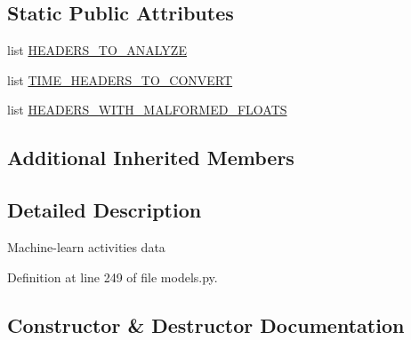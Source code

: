 \subsection*{Static Public Attributes}
\begin{DoxyCompactItemize}
\item 
list \hyperlink{classpygce_1_1analysis_1_1models_1_1_activities_data_analysis_a799ad90125cc686b985fe525a3b33062}{H\+E\+A\+D\+E\+R\+S\+\_\+\+T\+O\+\_\+\+A\+N\+A\+L\+Y\+ZE}
\item 
list \hyperlink{classpygce_1_1analysis_1_1models_1_1_activities_data_analysis_a2f0ccc7899b8c6b6d94391c80f5def1d}{T\+I\+M\+E\+\_\+\+H\+E\+A\+D\+E\+R\+S\+\_\+\+T\+O\+\_\+\+C\+O\+N\+V\+E\+RT}
\item 
list \hyperlink{classpygce_1_1analysis_1_1models_1_1_activities_data_analysis_a272e010f956a64a8f916ebf1b9e14255}{H\+E\+A\+D\+E\+R\+S\+\_\+\+W\+I\+T\+H\+\_\+\+M\+A\+L\+F\+O\+R\+M\+E\+D\+\_\+\+F\+L\+O\+A\+TS}
\end{DoxyCompactItemize}
\subsection*{Additional Inherited Members}


\subsection{Detailed Description}
\begin{DoxyVerb}Machine-learn activities data \end{DoxyVerb}
 

Definition at line 249 of file models.\+py.



\subsection{Constructor \& Destructor Documentation}
